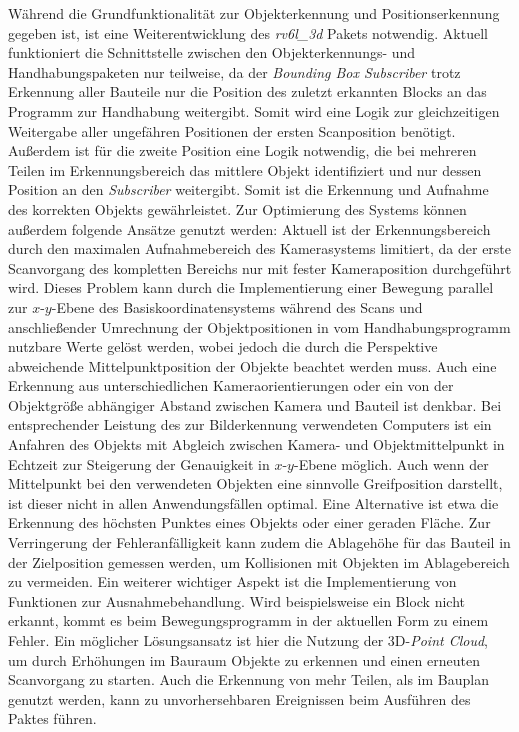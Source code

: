 Während die Grundfunktionalität zur Objekterkennung und Positionserkennung gegeben ist, ist eine Weiterentwicklung des \textit{rv6l\_3d} Pakets notwendig. Aktuell funktioniert die Schnittstelle zwischen den Objekterkennungs- und Handhabungspaketen nur teilweise, da der \textit{Bounding Box Subscriber}  trotz Erkennung aller Bauteile nur die Position des zuletzt erkannten Blocks an das Programm zur Handhabung weitergibt. Somit wird eine Logik zur gleichzeitigen Weitergabe aller ungefähren Positionen der ersten Scanposition benötigt. Außerdem ist für die zweite Position eine Logik notwendig, die bei mehreren Teilen im Erkennungsbereich das mittlere Objekt identifiziert und nur dessen Position an den \textit{Subscriber} weitergibt. Somit ist die Erkennung und Aufnahme des korrekten Objekts gewährleistet. 
Zur Optimierung des Systems können außerdem folgende Ansätze genutzt werden: Aktuell ist der Erkennungsbereich durch den maximalen Aufnahmebereich des Kamerasystems limitiert, da der erste Scanvorgang des kompletten Bereichs nur mit fester Kameraposition durchgeführt wird. Dieses Problem kann durch die Implementierung einer Bewegung parallel zur $x$-$y$-Ebene des Basiskoordinatensystems während des Scans und anschließender Umrechnung der Objektpositionen in vom Handhabungsprogramm nutzbare Werte gelöst werden, wobei jedoch die durch die Perspektive abweichende Mittelpunktposition der Objekte beachtet werden muss. Auch eine Erkennung aus unterschiedlichen Kameraorientierungen oder ein von der Objektgröße abhängiger Abstand zwischen Kamera und Bauteil ist denkbar. Bei entsprechender Leistung des zur Bilderkennung verwendeten Computers ist ein Anfahren des Objekts mit Abgleich zwischen Kamera- und Objektmittelpunkt in Echtzeit zur Steigerung der Genauigkeit in $x$-$y$-Ebene möglich. Auch wenn der Mittelpunkt bei den verwendeten Objekten eine sinnvolle Greifposition darstellt, ist dieser nicht in allen Anwendungsfällen optimal. Eine Alternative ist etwa die Erkennung des höchsten Punktes eines Objekts oder einer geraden Fläche. Zur Verringerung der Fehleranfälligkeit kann zudem die Ablagehöhe für das Bauteil in der Zielposition gemessen werden, um Kollisionen mit Objekten im Ablagebereich zu vermeiden. Ein weiterer wichtiger Aspekt ist die Implementierung von Funktionen zur Ausnahmebehandlung. Wird beispielsweise ein Block nicht erkannt, kommt es beim Bewegungsprogramm in der aktuellen Form zu einem Fehler. Ein möglicher Lösungsansatz ist hier die Nutzung der 3D-\textit{Point Cloud}, um durch Erhöhungen im Bauraum Objekte zu erkennen und einen erneuten Scanvorgang zu starten. Auch die Erkennung von mehr Teilen, als im Bauplan genutzt werden, kann zu unvorhersehbaren Ereignissen beim Ausführen des Paktes führen.

